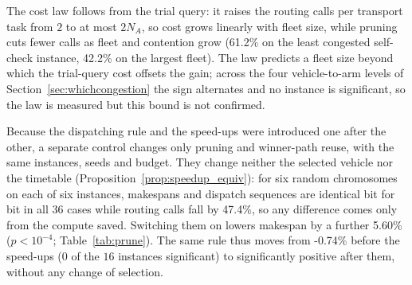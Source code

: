 \documentclass[preprint,review,12pt,authoryear]{elsarticle}
\newcommand{\RouteCallCutLo}{42.2\%}     %
\newcommand{\RouteCallCutHi}{61.2\%}     %
\newcommand{\RouteCallCut}{47.4\%}
\newcommand{\GainPrune}{5.60\%}
\newcommand{\PPrune}{<10^{-4}}
\newcommand{\MatrixCells}{16}
\newcommand{\GainProbePre}{-0.74\%}      %
\begin{document}
The cost law follows from the trial query: it raises the routing calls per transport task from $2$ to at most $2N_A$, so cost grows linearly with fleet size, while pruning cuts fewer calls as fleet and contention grow (\RouteCallCutHi{} on the least congested self-check instance, \RouteCallCutLo{} on the largest fleet). The law predicts a fleet size beyond which the trial-query cost offsets the gain; across the four vehicle-to-arm levels of Section~\ref{sec:whichcongestion} the sign alternates and no instance is significant, so the law is measured but this bound is not confirmed.

Because the dispatching rule and the speed-ups were introduced one after the other, a separate control changes only pruning and winner-path reuse, with the same instances, seeds and budget. They change neither the selected vehicle nor the timetable (Proposition~\ref{prop:speedup_equiv}): for six random chromosomes on each of six instances, makespans and dispatch sequences are identical bit for bit in all $36$ cases while routing calls fall by \RouteCallCut{}, so any difference comes only from the compute saved. Switching them on lowers makespan by a further \GainPrune{} ($p\PPrune$; Table~\ref{tab:prune}). The same rule thus moves from \GainProbePre{} before the speed-ups ($0$ of the $\MatrixCells$ instances significant) to significantly positive after them, without any change of selection.
\end{document}
